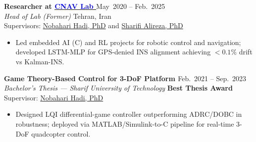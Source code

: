 \documentclass[12pt]{article}
\begin{document}
\noindent
{\bfseries Researcher at
\href{https://www.linkedin.com/company/cnav-lab/}{\textcolor{blue}{CNAV Lab \faLinkedin}} \href{https://github.com/CNAVLAB}{\faGithub}
\textcolor{red}{
\href{https://youtube.com/@cnavlab?si=Fc-Y3oyKdgAmz3-5}{\faYoutube}}
} \hfill May\ 2020 -- Feb.\ 2025 \\[2pt]
\noindent \textit{Head of Lab (Former)}
\hfill Tehran, Iran \\[2pt]
\noindent Supervisors:
\href{https://ae.sharif.edu/~portal/faculty/1091235256}{Nobahari Hadi, PhD} and
\href{https://ae.sharif.edu/~portal/faculty/1730782165}{Sharifi Alireza, PhD}
\vspace{-5pt}
\begin{itemize}  \itemsep 0pt
	\item Led embedded AI (C) and RL projects for robotic control and navigation; developed LSTM-MLP for GPS-denied INS alignment achieving $<0.1\%$ drift vs Kalman-INS. \href{https://github.com/alibaniasad1999/INS-AI}{\faGithub}
\end{itemize}
\vspace{-2pt}

\noindent
{\bfseries Game Theory-Based Control for 3-DoF Platform
\href{https://github.com/alibaniasad1999/bachelor-thesis}{\faGithub}
\textcolor{red}{
\href{https://youtu.be/SXZACxGaE1A?si=61yCRB8jFIZlldFG}{\faYoutube}}
} \hfill Feb.\ 2021 -- Sep.\ 2023 \\[2pt]
\noindent \textit{Bachelor's Thesis — Sharif University of Technology} \hfill {\footnotesize \textbf{Best Thesis Award \faMedal}} \\[2pt]
\noindent Supervisor: \href{https://ae.sharif.edu/~portal/faculty/1091235256}{Nobahari Hadi, PhD}
\vspace{-5pt}
\begin{itemize}  \itemsep 0pt
	\item Designed LQI differential-game controller outperforming ADRC/DOBC in robustness; deployed via MATLAB/Simulink-to-C pipeline for real-time 3-DoF quadcopter control.
\end{itemize}

\vspace{-12pt}
\end{document}
